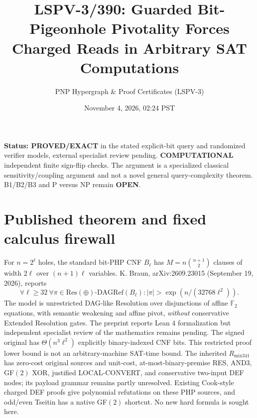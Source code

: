 \documentclass[11pt]{article}
\title{LSPV-3/390: Guarded Bit-Pigeonhole Pivotality Forces Charged Reads in Arbitrary SAT Computations}
\author{PNP Hypergraph \& Proof Certificates (LSPV-3)}
\date{November 4, 2026, 02:24 PST}
\begin{document}
\maketitle
\noindent\textbf{Status: PROVED/EXACT} in the stated explicit-bit query and randomized verifier models, external specialist review pending. \textbf{COMPUTATIONAL} independent finite sign-flip checks. The argument is a specialized classical sensitivity/coupling argument and not a novel general query-complexity theorem. B1/B2/B3 and P versus NP remain \textbf{OPEN}.
\section*{Published theorem and fixed calculus firewall}
For $n=2^\ell$ holes, the standard bit-PHP CNF $B_\ell$ has $M=n\binom{n+1}{2}$ clauses of width $2\ell$ over $(n+1)\ell$ variables. K. Braun, arXiv:2609.23015 (September 19, 2026), reports
\[
\forall\ell\ge32\ \forall\pi\in \mathrm{Res}(\oplus)\text{-DAGRef}(B_\ell):
|\pi|>\exp(n/(32768\ell^2)).
\]
The model is unrestricted DAG-like Resolution over disjunctions of affine $\mathbb F_2$ equations, with semantic weakening and affine pivot, \emph{without} conservative Extended Resolution gates. The preprint reports Lean 4 formalization but independent specialist review of the mathematics remains pending. The signed original has $\Theta(n^3\ell^2)$ explicitly binary-indexed CNF bits. This restricted proof lower bound is not an arbitrary-machine SAT-time bound. The inherited $R_{\mathrm{mix341}}$ has zero-cost original sources and unit-cost, at-most-binary-premise RES, AND3, GF$(2)$ XOR, justified LOCAL-CONVERT, and conservative two-input DEF nodes; its payload grammar remains partly unresolved. Existing Cook-style charged DEF proofs give polynomial refutations on these PHP sources, and odd/even Tseitin has a native GF$(2)$ shortcut. No new hard formula is sought here.
\end{document}
